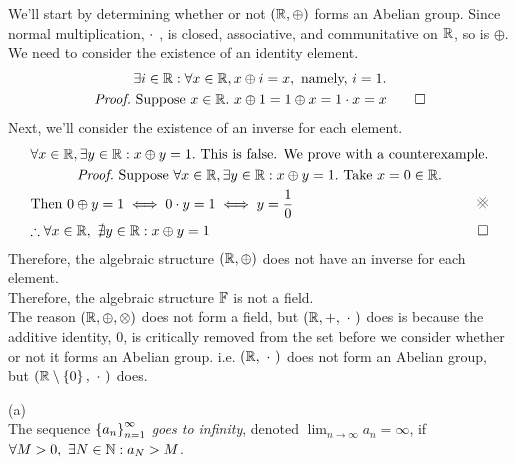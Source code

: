 \documentclass[a4paper,12pt]{report}
\begin{document}
We'll start by determining whether or not $(\mathbb{R},\oplus)$ forms an Abelian group. Since normal multiplication, $\cdot$ , is closed, associative, and communitative on $\mathbb{R}$, so is $\oplus$. We need to consider the existence of an identity element. 
\begin{gather*}
	\exists i\in\bbr: \forall x\in\bbr, x\oplus i = x,\ \text{namely,}\ i=1. \\
	\textit{Proof.}\ \Suppose x\in\bbr.\ x\oplus 1 = 1\oplus x = 1\cd x = x \qed
\end{gather*}
Next, we'll consider the existence of an inverse for each element.
\begin{gather*}
	\forall x\in\bbr, \exists y\in\bbr: x\oplus y = 1.\ \text{This is false. We prove with a counterexample.} \\
	\textit{Proof.}\ \Suppose \forall x\in\bbr,\exists y\in\bbr:x\oplus y = 1.\ \Take x=0\in\bbr.\\
	\Then 0\oplus y = 1 \iff 0\cd y = 1 \iff y = \frac{1}{0}\ \CONTRA \\
	\tf \forall x\in\bbr,\ \nexists y\in\bbr: x\oplus y = 1 \QED 
\end{gather*}
Therefore, the algebraic structure $(\mathbb{R}, \oplus)$ does not have an inverse for each element. \\
Therefore, the algebraic structure $\mathbb{F}$ is not a field. \\

The reason $(\mathbb{R}, \oplus, \otimes)$ does not form a field, but $(\bbr, +,\ \cd\ )$ does is because the additive identity, 0, is critically removed from the set before we consider whether or not it forms an Abelian group. i.e. $(\mathbb{R},\ \cdot\ )$ does not form an Abelian group, but $(\mathbb{R}\setminus\left\lbrace 0 \right\rbrace,\ \cdot\ )$ does.



\newpage
{}
\sol (a) \\
 The sequence $\left\lbrace a_n \right\rbrace_{n=1}^{\infty}$ \textit{goes to infinity}, denoted $\lim_{n\to\infty}a_n = \infty$, if $\forall M>0,\ \exists N\in\mathbb{N}: a_N > M$. \\
\end{document}
